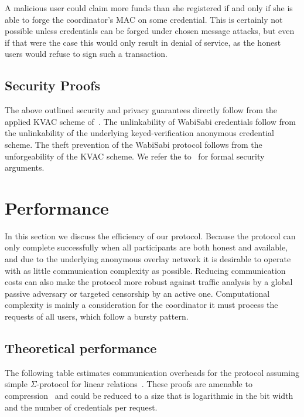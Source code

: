 \documentclass[a4paper]{article}
\begin{document}
A malicious user could claim more funds than she registered if and only if she is able to forge the coordinator's MAC on some credential. This is certainly not possible unless credentials can be forged under chosen message attacks, but even if that were the case this would only result in denial of service, as the honest users would refuse to sign such a transaction.

\subsection{Security Proofs}
The above outlined security and privacy guarantees directly follow from the applied KVAC scheme of~\cite{chase2019signal}. The unlinkability of WabiSabi credentials follow from the unlinkability of the underlying keyed-verification anonymous
credential scheme. The theft prevention of the WabiSabi protocol follows from the unforgeability of the KVAC scheme. We refer the to~\cite{chase2019signal} for formal security arguments.

\section{Performance}\label{sec:performanceanalysis}

In this section we discuss the efficiency of our protocol. Because the protocol can only complete successfully when all participants are both honest and available, and due to the underlying anonymous overlay network it is desirable to operate with as little communication complexity as possible. Reducing communication costs can also make the protocol more robust against traffic analysis by a global passive adversary or targeted censorship by an active one. Computational complexity is mainly a consideration for the coordinator it must process the requests of all users, which follow a bursty pattern.

\subsection{Theoretical performance}

The following table estimates communication overheads for the protocol assuming simple $\Sigma$-protocol for linear relations~\cite[19.5.3 pp. 747-8, 20.4.1 pp. 792]{boneh2020graduate}. These proofs are amenable to compression~\cite{bunz2018bulletproofs, attema2020compressed} and could be reduced to a size that is logarithmic in the bit width and the number of credentials per request.
\end{document}
